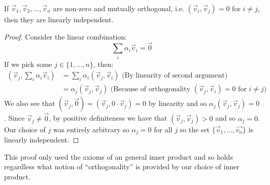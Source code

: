 \documentclass[../main.tex]{subfiles}
\begin{document}
\begin{proposition}
  If $\vec{v}_1, \vec{v}_2, \ldots, \vec{v}_n$ are non-zero and mutually orthogonal, i.e. $(\vec{v}_i, \vec{v}_j) = 0$ for $i \neq j$, then they are linearly independent.
\end{proposition}
\begin{proof}
  Consider the linear combination:
  \[
    \sum_{i}^{} \alpha_i \vec{v}_i = \vec{0}
  \]
  If we pick some $j \in \{1, \ldots, n\}$, then:
  \begin{align*}
    \left(\vec{v}_j, \sum_{i}^{} \alpha_i \vec{v}_i\right) &= \sum_{i}^{} \alpha_i (\vec{v}_j, \vec{v}_i) \text{ (By linearity of second argument)}\\
                                                           &= \alpha_j (\vec{v}_j, \vec{v}_j) \text{ (Because of orthogonality $(\vec{v}_j, \vec{v}_i) = 0$ for $i \neq j$)}
  \end{align*}
  We also see that $(\vec{v}_j, \vec{0}) = (\vec{v}_j, 0 \cdot \vec{v}_j) = 0$ by linearity and so $\alpha_j(\vec{v}_j, \vec{v}_j) = 0$.
  Since $\vec{v}_j \neq \vec{0}$, by positive definiteness we have that $(\vec{v}_j, \vec{v}_j) > 0$ and so $\alpha_j = 0$.
  Our choice of $j$ was entirely arbitrary so $\alpha_j = 0$ for all $j$ so the set $\{\vec{v}_1, \ldots, \vec{v_n}\}$ is linearly independent.
\end{proof}
\begin{remark}
  This proof only used the axioms of an general inner product and so holds regardless what notion of ``orthogonality'' is provided by our choice of inner product.
\end{remark}
\end{document}

